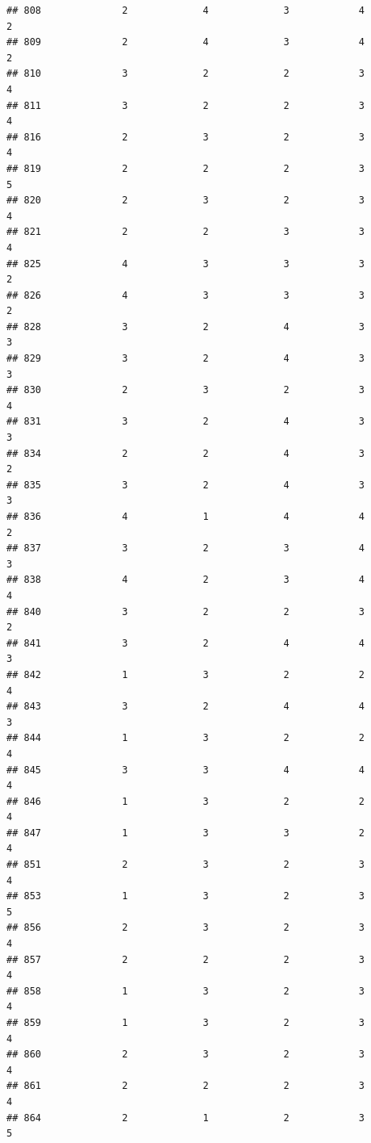 \documentclass[
]{article}
\begin{document}
\begin{verbatim}
## 808              2             4             3            4          2
## 809              2             4             3            4          2
## 810              3             2             2            3          4
## 811              3             2             2            3          4
## 816              2             3             2            3          4
## 819              2             2             2            3          5
## 820              2             3             2            3          4
## 821              2             2             3            3          4
## 825              4             3             3            3          2
## 826              4             3             3            3          2
## 828              3             2             4            3          3
## 829              3             2             4            3          3
## 830              2             3             2            3          4
## 831              3             2             4            3          3
## 834              2             2             4            3          2
## 835              3             2             4            3          3
## 836              4             1             4            4          2
## 837              3             2             3            4          3
## 838              4             2             3            4          4
## 840              3             2             2            3          2
## 841              3             2             4            4          3
## 842              1             3             2            2          4
## 843              3             2             4            4          3
## 844              1             3             2            2          4
## 845              3             3             4            4          4
## 846              1             3             2            2          4
## 847              1             3             3            2          4
## 851              2             3             2            3          4
## 853              1             3             2            3          5
## 856              2             3             2            3          4
## 857              2             2             2            3          4
## 858              1             3             2            3          4
## 859              1             3             2            3          4
## 860              2             3             2            3          4
## 861              2             2             2            3          4
## 864              2             1             2            3          5

\end{verbatim}
\end{document}
